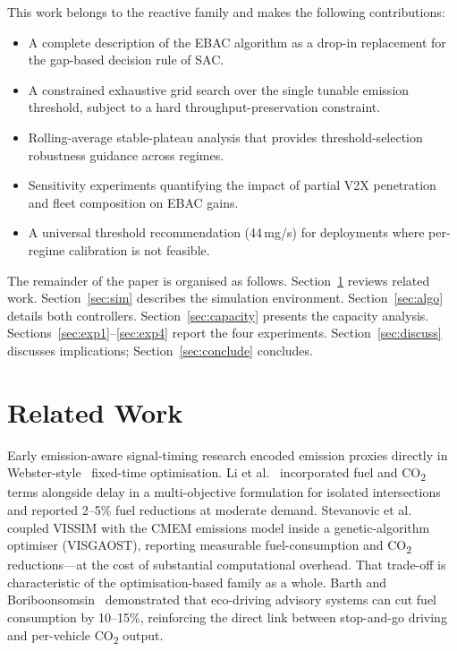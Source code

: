 \documentclass[review,3p,authoryear,times]{elsarticle}
\begin{document}
This work belongs to the reactive family and makes the following
contributions:
\begin{itemize}
  \item A complete description of the EBAC algorithm as a drop-in
        replacement for the gap-based decision rule of SAC.
  \item A constrained exhaustive grid search over the single tunable
        emission threshold, subject to a hard throughput-preservation
        constraint.
  \item Rolling-average stable-plateau analysis that provides
        threshold-selection robustness guidance across regimes.
  \item Sensitivity experiments quantifying the impact of partial V2X
        penetration and fleet composition on EBAC gains.
  \item A universal threshold recommendation (44\,mg/s) for deployments
        where per-regime calibration is not feasible.
\end{itemize}

The remainder of the paper is organised as follows.
Section~\ref{sec:related} reviews related work.
Section~\ref{sec:sim} describes the simulation environment.
Section~\ref{sec:algo} details both controllers.
Section~\ref{sec:capacity} presents the capacity analysis.
Sections~\ref{sec:exp1}--\ref{sec:exp4} report the four experiments.
Section~\ref{sec:discuss} discusses implications; Section~\ref{sec:conclude}
concludes.

\section{Related Work}
\label{sec:related}

Early emission-aware signal-timing research encoded emission proxies
directly in Webster-style~\cite{webster1958} fixed-time optimisation. Li et
al.~\cite{li2004signal} incorporated fuel and CO\textsubscript{2} terms
alongside delay in a multi-objective formulation for isolated intersections
and reported 2--5\% fuel reductions at moderate demand. Stevanovic et
al.~\cite{stevanovic2009} coupled VISSIM with the CMEM emissions model
inside a genetic-algorithm optimiser (VISGAOST), reporting measurable
fuel-consumption and CO\textsubscript{2} reductions---at the cost of
substantial computational overhead. That trade-off is characteristic of
the optimisation-based family as a whole. Barth and
Boriboonsomsin~\cite{barth2009} demonstrated that eco-driving advisory
systems can cut fuel consumption by 10--15\%, reinforcing the direct link
between stop-and-go driving and per-vehicle CO\textsubscript{2} output.
\end{document}
